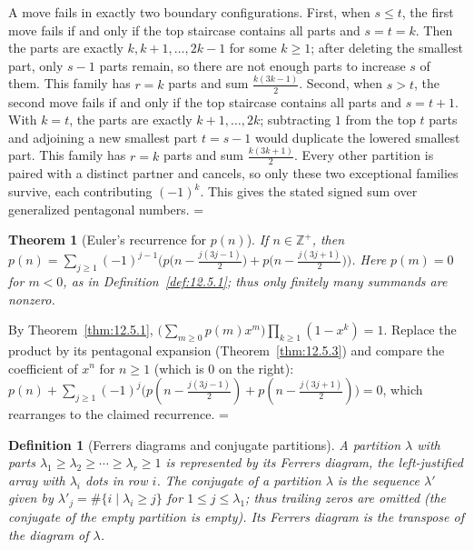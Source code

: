 \documentclass[11pt]{article}
\makeatletter
\let\nt@closedisplay\]
\def\nt@guardedclose{\@ifnextchar\par{\nt@closeafterpar}{\@ifnextchar\end{\postdisplaypenalty\@M\nt@closedisplay}{\nt@closedisplay}}}
\def\nt@closeafterpar\par{\@ifnextchar\par{\nt@closeafterpar}{\@ifnextchar\end{\postdisplaypenalty\@M\nt@closedisplay\par}{\nt@closedisplay\par}}}
\renewenvironment{proof}[1][\proofname]{\par
  \pushQED{\qed}\normalfont\topsep\medskipamount\edef\nt@afterproof{\@endparpenalty=\the\@endparpenalty\relax}\@beginparpenalty\@M\@endparpenalty\@M\let\]\nt@guardedclose\trivlist\item[]\textit{#1\@addpunct{.}} \ignorespaces}{\ifvmode\addpenalty\@M\fi\popQED\nt@afterproof\endtrivlist\@endpefalse}
\theoremstyle{ntstyle}
\newtheorem{theorem}{Theorem}[subsection]
\newtheorem{definition}{Definition}[subsection]
\makeatother
\begin{document}
\begin{proof}
  A move fails in exactly two boundary configurations. First, when
  $s\le t$, the first move fails if and only if the top staircase
  contains all parts and $s=t=k$. Then the parts are exactly
  $k,k+1,\ldots,2k-1$ for some $k\ge1$; after deleting the smallest part,
  only $s-1$ parts remain, so there are not enough parts to increase $s$ of them.
  This family has $r=k$ parts and sum $\tfrac{k(3k-1)}{2}$. Second, when
  $s>t$, the second move fails if and only if the top staircase
  contains all parts and $s=t+1$. With $k=t$, the parts are
  exactly $k+1,\ldots,2k$; subtracting $1$ from the top $t$ parts
  and adjoining a new smallest part $t=s-1$ would duplicate the
  lowered smallest part. This family has $r=k$ parts and sum
  $\tfrac{k(3k+1)}{2}$. Every other partition is
  paired with a distinct partner and cancels, so only these two
  exceptional families survive, each contributing $(-1)^k$. This gives
  the stated signed sum over generalized pentagonal numbers.
\end{proof}

\begin{theorem}[Euler's recurrence for $p(n)$]\label{thm:12.5.4}\label{thm:euler-recurrence-for-p-n}
  If $n\in\mathbb{Z}^+$, then
  $p(n)=\sum_{j\ge1}(-1)^{j-1}\Big(p\big(n-\tfrac{j(3j-1)}{2}\big)+p\big(n-\tfrac{j(3j+1)}{2}\big)\Big)$.
  Here $p(m)=0$ for $m<0$, as in Definition~\ref{def:12.5.1}; thus only
  finitely many summands are nonzero.

\end{theorem}

\begin{proof} By Theorem~\ref{thm:12.5.1},
  $\big(\sum_{m\ge0}p(m)x^m\big)\prod_{k\ge1}(1-x^k)=1$. Replace the
  product by its pentagonal expansion (Theorem~\ref{thm:12.5.3}) and compare the
  coefficient of $x^n$ for $n\ge1$ (which is $0$ on the right):
  $p(n)+\sum_{j\ge1}(-1)^j\big(p(n-\tfrac{j(3j-1)}{2})+p(n-\tfrac{j(3j+1)}{2})\big)=0$,
  which rearranges to the claimed recurrence.
\end{proof}

\begin{definition}[Ferrers diagrams and conjugate partitions]\label{def:12.5.2}\label{def:ferrers-diagrams-and-conjugate-partitions}
  A partition
  $\lambda$ with parts $\lambda_1\ge\lambda_2\ge\cdots\ge\lambda_r\ge1$
  is represented by its Ferrers diagram, the left-justified array with
  $\lambda_i$ dots in row $i$.
  The conjugate of a partition $\lambda$ is the sequence $\lambda'$ given by
  $\lambda'_j=\#\{i \mid \lambda_i\ge j\}$ for
  $1\le j\le\lambda_1$; thus trailing zeros are omitted (the conjugate of the empty partition is empty). Its Ferrers
  diagram is the transpose of the diagram of $\lambda$.

\end{definition}
\end{document}
